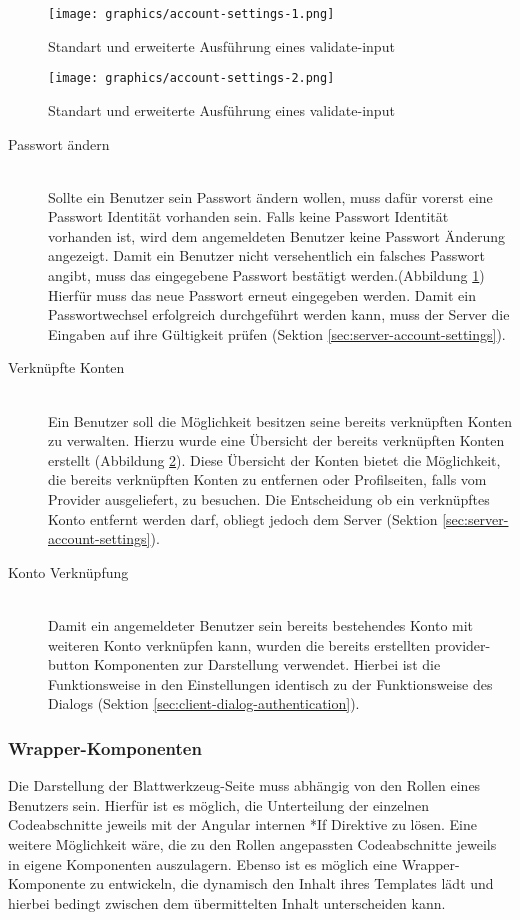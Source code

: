 \begin{figure}
	\centering
	\texttt{[image: graphics/account-settings-1.png]}
	\caption{Standart und erweiterte Ausführung eines validate-input}
	\label{fig:account_settings_1}
\end{figure}

\begin{figure}
	\centering
	\texttt{[image: graphics/account-settings-2.png]}
	\caption{Standart und erweiterte Ausführung eines validate-input}
	\label{fig:account_settings_2}
\end{figure}


\begin{description}
	\item[Passwort ändern]\hfill\\
	Sollte ein Benutzer sein Passwort ändern wollen, muss dafür vorerst eine Passwort Identität vorhanden sein. Falls keine Passwort Identität vorhanden ist, wird dem angemeldeten Benutzer keine Passwort Änderung angezeigt. Damit ein Benutzer nicht versehentlich ein falsches Passwort angibt, muss das eingegebene Passwort bestätigt werden.(Abbildung \ref{fig:account_settings_1}) Hierfür muss das neue Passwort erneut eingegeben werden. Damit ein Passwortwechsel erfolgreich durchgeführt werden kann, muss der Server die Eingaben auf ihre Gültigkeit prüfen (Sektion \ref{sec:server-account-settings}).
	\item[Verknüpfte Konten]\hfill\\
	Ein Benutzer soll die Möglichkeit besitzen seine bereits verknüpften Konten zu verwalten. Hierzu wurde eine Übersicht der bereits verknüpften Konten erstellt (Abbildung \ref{fig:account_settings_2}). Diese Übersicht der Konten bietet die Möglichkeit, die bereits verknüpften Konten zu entfernen oder Profilseiten, falls vom Provider ausgeliefert, zu besuchen. Die Entscheidung ob ein verknüpftes Konto entfernt werden darf, obliegt jedoch dem Server (Sektion \ref{sec:server-account-settings}).
	\item[Konto Verknüpfung]\hfill\\
	Damit ein angemeldeter Benutzer sein bereits bestehendes Konto mit weiteren Konto verknüpfen kann, wurden die bereits erstellten provider-button Komponenten zur Darstellung verwendet. Hierbei ist die Funktionsweise in den Einstellungen identisch zu der Funktionsweise des Dialogs (Sektion \ref{sec:client-dialog-authentication}).
\end{description}

\subsubsection{Wrapper-Komponenten}
\label{sec:client-wrapper-components}
Die Darstellung der Blattwerkzeug-Seite muss abhängig von den Rollen eines Benutzers sein. Hierfür ist es möglich, die Unterteilung der einzelnen Codeabschnitte jeweils mit der Angular internen *If Direktive zu lösen. Eine weitere Möglichkeit wäre, die zu den Rollen angepassten Codeabschnitte jeweils in eigene Komponenten auszulagern. Ebenso ist es möglich eine Wrapper-Komponente zu entwickeln, die dynamisch den Inhalt ihres Templates lädt und hierbei bedingt zwischen dem übermittelten Inhalt unterscheiden kann.

